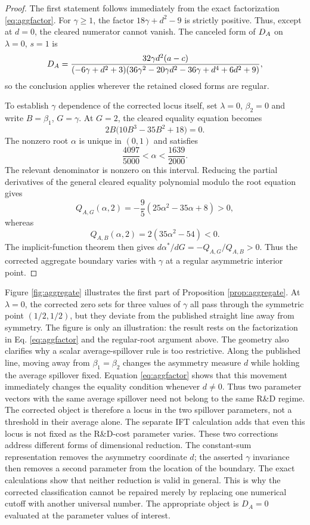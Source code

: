 \begin{proof}
The first statement follows immediately from the exact factorization \eqref{eq:aggfactor}. For $\gamma\geq1$, the factor $18\gamma+d^2-9$ is strictly positive. Thus, except at $d=0$, the cleared numerator cannot vanish. The canceled form of $D_A$ on $\lambda=0$, $s=1$ is
\[
 D_A=\frac{32\gamma d^2(a-c)}{(-6\gamma+d^2+3)(36\gamma^2-20\gamma d^2-36\gamma+d^4+6d^2+9)},
\]
so the conclusion applies wherever the retained closed forms are regular.

To establish $\gamma$ dependence of the corrected locus itself, set $\lambda=0$, $\beta_2=0$ and write $B=\beta_1$, $G=\gamma$. At $G=2$, the cleared equality equation becomes
\begin{equation}\label{eq:alphaeq}
 2B\bigl(10B^3-35B^2+18\bigr)=0.
\end{equation}
The nonzero root $\alpha$ is unique in $(0,1)$ and satisfies
\[
 \frac{4097}{5000}<\alpha<\frac{1639}{2000}.
\]
The relevant denominator is nonzero on this interval. Reducing the partial derivatives of the general cleared equality polynomial modulo the root equation gives
\[
 Q_{A,G}(\alpha,2)=-\frac95(25\alpha^2-35\alpha+8)>0,
\]
whereas
\[
 Q_{A,B}(\alpha,2)=2(35\alpha^2-54)<0.
\]
The implicit-function theorem then gives $d\alpha^*/dG=-Q_{A,G}/Q_{A,B}>0$. Thus the corrected aggregate boundary varies with $\gamma$ at a regular asymmetric interior point.\qedhere
\end{proof}

Figure \ref{fig:aggregate} illustrates the first part of Proposition \ref{prop:aggregate}. At $\lambda=0$, the corrected zero sets for three values of $\gamma$ all pass through the symmetric point $(1/2,1/2)$, but they deviate from the published straight line away from symmetry. The figure is only an illustration: the result rests on the factorization in Eq. \eqref{eq:aggfactor} and the regular-root argument above. The geometry also clarifies why a scalar average-spillover rule is too restrictive. Along the published line, moving away from $\beta_1=\beta_2$ changes the asymmetry measure $d$ while holding the average spillover fixed. Equation \eqref{eq:aggfactor} shows that this movement immediately changes the equality condition whenever $d\neq0$. Thus two parameter vectors with the same average spillover need not belong to the same R\&D regime. The corrected object is therefore a locus in the two spillover parameters, not a threshold in their average alone. The separate IFT calculation adds that even this locus is not fixed as the R\&D-cost parameter varies. These two corrections address different forms of dimensional reduction. The constant-sum representation removes the asymmetry coordinate $d$; the asserted $\gamma$ invariance then removes a second parameter from the location of the boundary. The exact calculations show that neither reduction is valid in general. This is why the corrected classification cannot be repaired merely by replacing one numerical cutoff with another universal number. The appropriate object is $D_A=0$ evaluated at the parameter values of interest.

